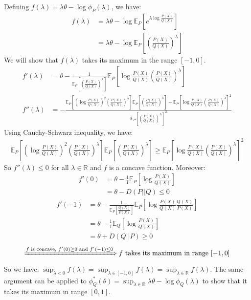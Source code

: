 \documentclass{article}
\numberwithin{equation}{section}
\newcommand{\EX}[2][]{\mathbb{E}_{#1}\left[#2\right]}%
\begin{document}
Defining \(f(\lambda) = \lambda \theta - \log \phi_P(\lambda)\), we have:
\begin{align}
f(\lambda) &= \lambda \theta - \log \EX[P]{e^{\lambda \log \frac{P(X)}{Q(X)}}}\\
&= \lambda \theta - \log \EX[P]{{\left(\frac{P(X)}{Q(X)}\right)}^\lambda}
\end{align}
We will show that \(f(\lambda)\) takes its maximum in the range \([-1, 0]\).
\begin{align}
f'(\lambda) &= \theta - \frac{1}{\EX[P]{{\left(\frac{P(X)}{Q(X)}\right)}^\lambda}} \EX[P]{\log \frac{P(X)}{Q(X)} {\left(\frac{P(X)}{Q(X)}\right)}^{\lambda}}\\
f''(\lambda) &= -\frac{\EX[P]{\left(\log \frac{P(X)}{Q(X)}\right)^2 {\left(\frac{P(X)}{Q(X)}\right)}^{\lambda}}\EX[P]{{\left(\frac{P(X)}{Q(X)}\right)}^\lambda} - \EX[P]{\log \frac{P(X)}{Q(X)} {\left(\frac{P(X)}{Q(X)}\right)}^{\lambda}}^2}{\EX[P]{{\left(\frac{P(X)}{Q(X)}\right)}^\lambda}^2}
\end{align}
Using Cauchy-Schwarz inequality, we have:
\begin{align}
\EX[P]{\left(\log \frac{P(X)}{Q(X)}\right)^2 {\left(\frac{P(X)}{Q(X)}\right)}^{\lambda}}\EX[P]{{\left(\frac{P(X)}{Q(X)}\right)}^\lambda} \ge \EX[P]{\log \frac{P(X)}{Q(X)} {\left(\frac{P(X)}{Q(X)}\right)}^{\lambda}}^2
\end{align}
So \(f''(\lambda) \le 0\) for all \(\lambda \in \mathbb{R}\) and \(f\) is a concave function.
Moreover:
\begin{align}
f'(0) &= \theta - \frac{1}{1}\EX[P]{\log \frac{P(X)}{Q(X)}}\\
&= \theta - D(P||Q) \le 0
\end{align}
\begin{align}
f'(-1) &= \theta - \frac{1}{\EX[P]{\frac{Q(X)}{P(X)}}} \EX[P]{\log \frac{P(X)}{Q(X)} \frac{Q(X)}{P(X)}}\\
&= \theta - \frac{1}{1}\EX[Q]{\log \frac{P(X)}{Q(X)} }\\
&= \theta + D(Q||P) \ge 0
\end{align}
\begin{equation*}
\xRightarrow{f \text{ is concave, }f'(0) \ge 0 \text{ and }f'(-1) \le 0}
f \text{ takes its maximum in range }[-1, 0] 
\end{equation*}
So we have: \(\sup_{\lambda < 0} f(\lambda) = \sup_{\lambda \in [-1, 0]} f(\lambda) = \sup_{\lambda \in \mathbb{R}} f(\lambda)\).
The same argument can be applied to \(\phi_Q^*(\theta) = \sup_{\lambda \in \mathbb{R}}\lambda \theta - \log \phi_Q(\lambda)\) to show that it takes its maximum in range \([0, 1]\).
\end{document}
